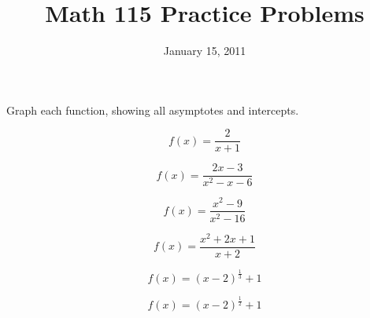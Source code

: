 \documentclass[fleqn,addpoints]{exam}
\title{Math 115 Practice Problems}
\date{January 15, 2011}
\begin{document}
\maketitle

Graph each function, showing all asymptotes and intercepts.
 
\begin{questions}

\question
\[
  f(x) = \frac{2}{x+1}
\]

\question
\[
  f(x) = \frac{2x-3}{x^2-x-6}
\]

\question
\[
  f(x) = \frac{x^2-9}{x^2-16}
\]

\question
\[
  f(x) = \frac{x^2+2x+1}{x+2}
\]

\question
\[
  f(x) = (x-2)^{\frac{1}{3}} + 1
\]

\question
\[
  f(x) = (x-2)^{\frac{1}{2}} + 1
\]

\end{questions}
\end{document}
